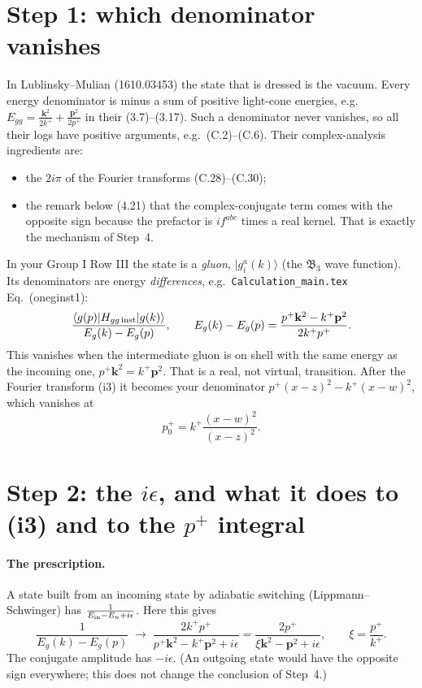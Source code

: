 \documentclass[10pt]{article}
\numberwithin{equation}{section}
\begin{document}
\section{Step 1: which denominator vanishes}
In Lublinsky--Mulian (1610.03453) the state that is dressed is the vacuum. Every energy denominator is minus a sum of positive light-cone energies, e.g.\ $E_{gg}=\frac{\mathbf k^2}{2k^+}+\frac{\mathbf p^2}{2p^+}$ in their (3.7)--(3.17). Such a denominator never vanishes, so all their logs have positive arguments, e.g.\ (C.2)--(C.6). Their complex-analysis ingredients are:
\begin{itemize}
\item the $2i\pi$ of the Fourier transforms (C.28)--(C.30);
\item the remark below (4.21) that the complex-conjugate term comes with the opposite sign because the prefactor is $i f^{abc}$ times a real kernel. That is exactly the mechanism of Step~4.
\end{itemize}
In your Group I Row III the state is a \emph{gluon}, $|g^a_i(k)\rangle$ (the $\mathfrak B_3$ wave function). Its denominators are energy \emph{differences}, e.g.\ \texttt{Calculation\_main.tex} Eq.~(oneginst1):
\begin{equation}
\frac{\langle g(p)|H_{gg\,\rm inst}|g(k)\rangle}{E_g(k)-E_g(p)},\qquad E_g(k)-E_g(p)=\frac{p^+\mathbf k^2-k^+\mathbf p^2}{2k^+p^+}.
\end{equation}
This vanishes when the intermediate gluon is on shell with the same energy as the incoming one, $p^+\mathbf k^2=k^+\mathbf p^2$. That is a real, not virtual, transition. After the Fourier transform (i3) it becomes your denominator $p^+(x-z)^2-k^+(x-w)^2$, which vanishes at
\begin{equation}
p_0^+=k^+\frac{(x-w)^2}{(x-z)^2}.
\end{equation}

\section{Step 2: the $i\epsilon$, and what it does to (i3) and to the $p^+$ integral}
\paragraph{The prescription.} A state built from an incoming state by adiabatic switching (Lippmann--Schwinger) has $\frac{1}{E_{\rm in}-E_n+i\epsilon}$. Here this gives
\begin{equation}
\frac{1}{E_g(k)-E_g(p)}\;\to\;\frac{2k^+p^+}{p^+\mathbf k^2-k^+\mathbf p^2+i\epsilon}=\frac{2p^+}{\xi\mathbf k^2-\mathbf p^2+i\epsilon},\qquad \xi=\frac{p^+}{k^+}.
\end{equation}
The conjugate amplitude has $-i\epsilon$. (An outgoing state would have the opposite sign everywhere; this does not change the conclusion of Step~4.)
\end{document}
